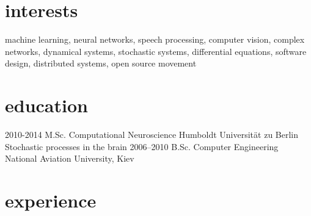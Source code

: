 \documentclass[]{cv}
\begin{document}
\section{interests}

machine learning, neural networks, speech processing, computer vision, complex networks, dynamical systems, stochastic systems, differential equations, software design, distributed systems, open source movement

\section{education}

\begin{entrylist}
  \entry
    {2010-2014}
    {M.Sc. Computational Neuroscience}
    {Humboldt Universität zu Berlin}
    {Stochastic processes in the brain}
  \entry
    {2006–2010}
    {B.Sc. Computer Engineering}
    {National Aviation University, Kiev}
    {}
\end{entrylist}

\section{experience}
\end{document}
